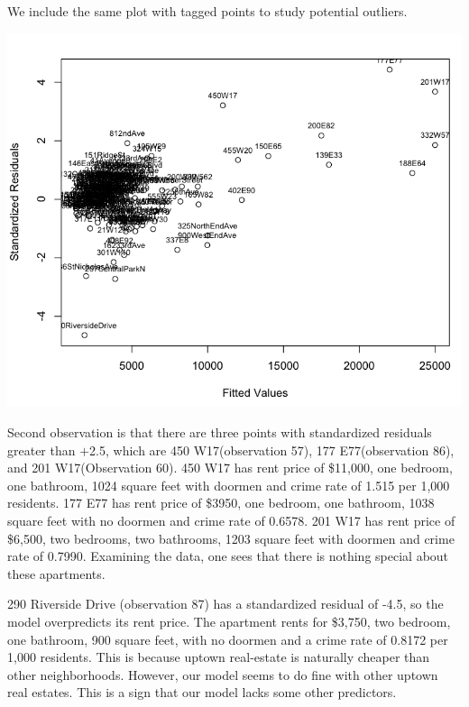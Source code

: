 \documentclass[a4 paper, 11 pt, twocolumn]{article}
\begin{document}
We include the same plot with tagged points to study potential outliers.
\begin{center}
\includegraphics[scale=0.3]{residualbrush}
\end{center}
Second observation is that there are three points with standardized residuals greater than $+$2.5, which are 450 W17(observation 57), 177 E77(observation 86), and 201 W17(Observation 60). 450 W17 has rent price of \$11,000, one bedroom, one bathroom, 1024 square feet with doormen and crime rate of 1.515 per 1,000 residents. 177 E77 has rent price of \$3950, one bedroom, one bathroom, 1038 square feet with no doormen and crime rate of 0.6578. 201 W17 has rent price of \$6,500, two bedrooms, two bathrooms, 1203 square feet with doormen and crime rate of 0.7990. Examining the data, one sees that there is nothing special about these apartments.

290 Riverside Drive (observation 87) has a standardized residual of -4.5, so the model overpredicts its rent price. The apartment rents for \$3,750, two bedroom, one bathroom, 900 square feet, with no doormen and a crime rate of 0.8172 per 1,000 residents. This is because uptown real-estate is naturally cheaper than other neighborhoods. However, our model seems to do fine with other uptown real estates. This is a sign that our model lacks some other predictors.
\end{document}
